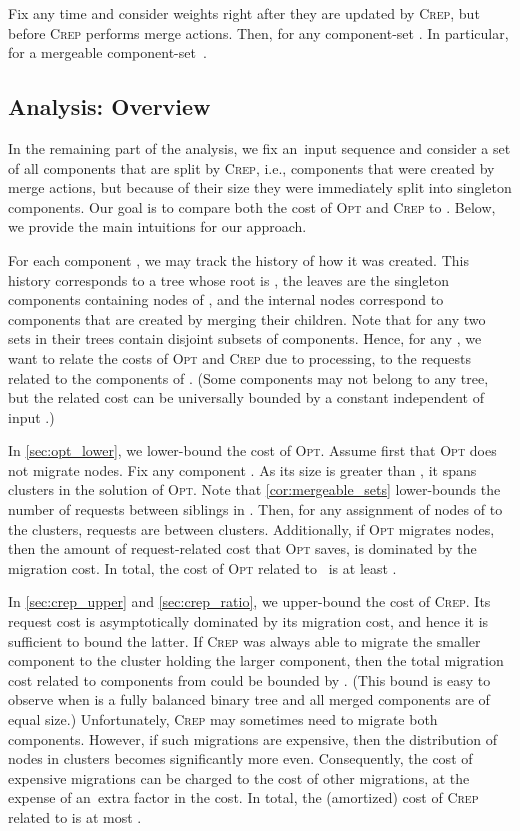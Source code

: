 \documentclass{siamart190516}
\newcommand{\OPT}{\textsc{Opt}\xspace}
\newcommand{\CREP}{\textsc{Crep}\xspace}
\begin{document}
\begin{corollary}
\label{cor:mergeable_sets} Fix any time  and consider weights right after
they are updated by \CREP, but before \CREP performs merge actions. Then,
 for any component-set . In particular,
 for a mergeable component-set~.
\end{corollary}


\subsection{Analysis: Overview}

In the remaining part of the analysis, we fix an~input sequence  and
consider a set  of all components that are split by \CREP, i.e.,
components that were created by merge actions, but because of their size they
were immediately split into singleton components. Our goal is to compare both
the cost of \OPT and \CREP to . 
Below, we provide the main intuitions for our approach.

For each component , we may track the history of how it was
created. This history corresponds to a tree  whose root is , the leaves are the singleton components containing nodes of , and the internal nodes correspond
to components that are created by merging their children. Note that for any
two sets in  their trees contain disjoint subsets of components.
Hence, for any , we want to relate the costs of \OPT and
\CREP due to processing, 
to the requests related to the components of . (Some
components may not belong to any tree, but the related cost can be universally
bounded by a constant independent of input .)

In \cref{sec:opt_lower}, we lower-bound the cost of \OPT. Assume first that \OPT
does not migrate nodes. Fix any component . As its size is
greater than , it spans  clusters in the solution of \OPT. Note
that \cref{cor:mergeable_sets} lower-bounds the number of requests between
siblings in . Then, for any assignment of nodes of  to 
the clusters,  requests are between clusters.
Additionally, if \OPT migrates nodes, then the amount of
request-related cost that \OPT saves, is dominated by the migration cost. In total,
the cost of \OPT related to~ is at least .

In \cref{sec:crep_upper} and \cref{sec:crep_ratio}, we upper-bound the cost of
\CREP. Its request cost is asymptotically dominated by its migration cost, and
hence it is sufficient to bound the latter. If \CREP was always able to migrate
the smaller component to the cluster holding the larger component, then the
total migration cost related to components from  could be bounded by
. (This bound is easy to observe when
 is a fully balanced binary tree and all merged components are of equal
size.) Unfortunately, \CREP may sometimes need to migrate both components. 
However, if such migrations are expensive, then the
distribution of nodes in clusters becomes significantly more even. Consequently, 
the cost of expensive migrations can be charged to the cost of other migrations,
at the expense of an~extra  factor in the cost.
In total, the (amortized) cost of \CREP related to  is at most
.
\end{document}
